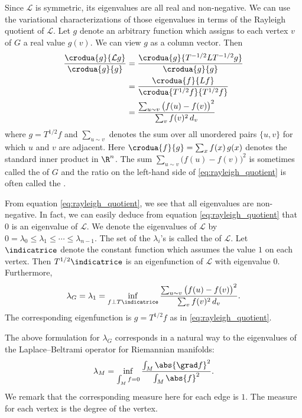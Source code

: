 Since $\mathcal{L}$ is symmetric, its eigenvalues are all real and non-negative. We can use the variational characterizations of those eigenvalues in terms of the Rayleigh quotient of $\mathcal{L}$. Let $g$ denote an arbitrary function which assigns to each vertex $v$ of $G$ a real value $g(v)$. We can view $g$ as a column vector. Then
\begin{align}
    \frac{\crodua{g}{\mathcal{L}g}}{\crodua{g}{g}} &= \frac{\crodua{g}{T^{-1/2} L T^{-1/2} g}}{\crodua{g}{g}} \nonumber \\
    &= \frac{\crodua{f}{Lf}}{\crodua{T^{1/2} f}{T^{1/2} f}} \nonumber \\
    &= \frac{\sum_{u \sim v} \big( f(u) - f(v) \big)^2}{\sum_v f(v)^2 \, d_v} \label{eq:rayleigh_quotient}
\end{align}
where $g = T^{1/2} f$ and $\sum_{u \sim v}$ denotes the sum over all unordered pairs $\{u, v\}$ for which $u$ and $v$ are adjacent. Here $\crodua{f}{g} = \sum_x f(x) \, g(x)$ denotes the standard inner product in $\R^n$. The sum $\sum_{u \sim v} \big( f(u) - f(v) \big)^2$ is sometimes called the  of $G$ and the ratio on the left-hand side of \ref{eq:rayleigh_quotient} is often called the . 

From equation \ref{eq:rayleigh_quotient}, we see that all eigenvalues are non-negative. In fact, we can easily deduce from equation \ref{eq:rayleigh_quotient} that $0$ is an eigenvalue of $\mathcal{L}$. We denote the eigenvalues of $\mathcal{L}$ by $0 = \lambda_0 \leqslant \lambda_1 \leqslant \cdots \leqslant \lambda_{n-1}$. The set of the $\lambda_i$'s is called the  of $\mathcal{L}$. Let $\indicatrice$ denote the constant function which assumes the value $1$ on each vertex. Then $T^{1/2} \indicatrice$ is an eigenfunction of $\mathcal{L}$ with eigenvalue $0$. Furthermore,
\begin{equation} \label{eq:lambdaG}
    \lambda_G = \lambda_1 = \inf_{f \perp T \indicatrice} \frac{\sum_{u \sim v} \big( f(u) - f(v) \big)^2}{\sum_v f(v)^2 \, d_v}.
\end{equation}
The corresponding eigenfunction is $g = T^{1/2} f$ as in \ref{eq:rayleigh_quotient}. 

The above formulation for $\lambda_G$ corresponds in a natural way to the eigenvalues of the Laplace--Beltrami operator for Riemannian manifolds:
\[
\lambda_M = \inf_{\int_M f = 0} \frac{\int_M \abs{\grad f}^2}{\int_M \abs{f}^2}.
\]
We remark that the corresponding measure here for each edge is $1$. The measure for each vertex is the degree of the vertex.

